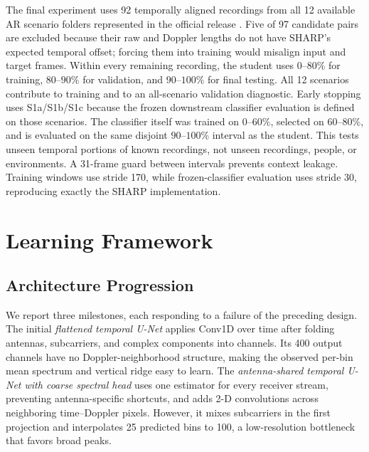 The final experiment uses 92 temporally aligned recordings from all 12
available AR scenario folders represented in the official release
\cite{meneghello2023dataset}. Five of 97 candidate pairs are excluded because
their raw and Doppler lengths do not have SHARP's expected temporal offset;
forcing them into training would misalign input and target frames. Within every
remaining recording, the student uses \(0\)--\(80\%\) for training,
\(80\)--\(90\%\) for validation, and \(90\)--\(100\%\) for final testing. All
12 scenarios contribute to training and to an all-scenario validation diagnostic.
Early stopping uses S1a/S1b/S1c because the frozen downstream classifier
evaluation is defined on those scenarios. The classifier itself was trained on \(0\)--\(60\%\), selected on
\(60\)--\(80\%\), and is evaluated on the same disjoint \(90\)--\(100\%\)
interval as the student. This tests unseen temporal portions of known
recordings, not unseen recordings, people, or environments. A 31-frame guard
between intervals prevents context leakage. Training windows use stride 170,
while frozen-classifier evaluation uses stride 30, reproducing exactly the SHARP implementation.

\section{Learning Framework}
\label{sec:framework}

\subsection{Architecture Progression}

We report three milestones, each responding to a failure of the preceding
design. The initial \emph{flattened temporal U-Net} applies Conv1D over time
after folding antennas, subcarriers, and complex components into channels. Its
400 output channels have no Doppler-neighborhood structure, making the observed
per-bin mean spectrum and vertical ridge easy to learn. The
\emph{antenna-shared temporal U-Net with coarse spectral head} uses one
estimator for every receiver stream, preventing antenna-specific shortcuts, and
adds 2-D convolutions across neighboring time--Doppler pixels. However, it
mixes subcarriers in the first projection and interpolates 25 predicted bins to
100, a low-resolution bottleneck that favors broad peaks.

